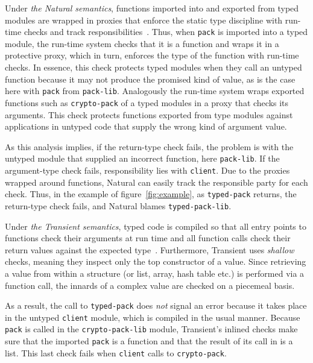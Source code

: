 Under {\it the Natural semantics\/}, functions imported into and exported from
typed modules are wrapped in proxies that enforce the static type discipline
with run-time checks and track responsibilities~\cite{tf-popl-2008,
tfffgksst-snapl-2017}. Thus, when {\tt pack} is imported into a typed module,
the run-time system checks that it is a function and wraps it in a protective
proxy, which in turn, enforces the type of the function with run-time checks.
In essence, this check protects typed modules when they call an untyped function
because it may not produce the promised kind of value, as is the case here with
{\tt pack} from {\tt pack-lib}. Analogously the run-time system wraps exported
functions such as {\tt crypto-pack} of a typed modules in a proxy that checks
its arguments.  This check protects functions exported from type modules against
applications in untyped code that supply the wrong kind of argument value.

As this analysis implies, if the return-type check fails, the problem is with
the untyped module that supplied an incorrect function, here {\tt pack-lib}. If
the argument-type check fails, responsibility lies with {\tt client}. Due to the
proxies wrapped around functions, Natural can easily track the responsible party
for each check. Thus, in the example of figure~\ref{fig:example}, as
\texttt{typed-pack} returns, the return-type check fails, and Natural blames
\texttt{typed-pack-lib}.

Under {\it the Transient semantics\/}, typed code is compiled so that all entry
points to functions check their arguments at run time and all function calls
check their return values against the expected type~\cite{vss-popl-2017}.
Furthermore, Transient uses \emph{shallow} checks, meaning they inspect only the
top constructor of a value. Since retrieving a value from within a structure (or
list, array, hash table etc.) is performed via a function call, the innards of a
complex value are checked on a piecemeal basis.

As a result, the call to \texttt{typed-pack} does {\em not\/} signal an error
because it takes place in the untyped {\tt client} module, which is compiled in
the usual manner. Because {\tt pack} is called in the {\tt crypto-pack-lib}
module, Transient's inlined checks make sure that the imported
\texttt{pack} is a function and that the result of its call in is a list. This
last check fails when \texttt{client} calls to {\tt crypto-pack}.

